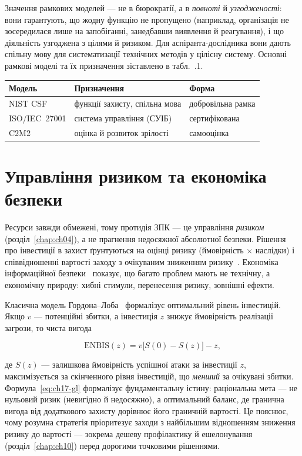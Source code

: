 Значення рамкових моделей --- не в бюрократії, а в \emph{повноті} й \emph{узгодженості}: вони гарантують, що жодну функцію не пропущено (наприклад, організація не зосередилася лише на запобіганні, занедбавши виявлення й реагування), і що діяльність узгоджена з цілями й ризиком. Для аспіранта-дослідника вони дають спільну мову для систематизації технічних методів у цілісну систему. Основні рамкові моделі та їх призначення зіставлено в табл.~\thechapter.1.


\begin{center}\footnotesize
\begin{tabularx}{\linewidth}{L{22mm} Y L{18mm}}
\toprule
Модель & Призначення & Форма \\
\midrule
NIST CSF & функції захисту, спільна мова & добровільна рамка \\
ISO/IEC~27001 & система управління (СУІБ) & сертифікована \\
C2M2 & оцінка й розвиток зрілості & самооцінка \\
\bottomrule
\end{tabularx}
\end{center}

\section{Управління ризиком та економіка безпеки}\label{sec:ch17-risk}

Ресурси завжди обмежені, тому протидія ЗПК --- це управління \emph{ризиком} (розділ~\ref{chap:ch04}), а не прагнення недосяжної абсолютної безпеки. Рішення про інвестиції в захист ґрунтуються на оцінці ризику (ймовірність $\times$ наслідки) і співвідношенні вартості заходу з очікуваним зниженням ризику~\cite{ch17:fair}. Економіка інформаційної безпеки~\cite{ch17:anderson} показує, що багато проблем мають не технічну, а економічну природу: хибні стимули, перенесення ризику, зовнішні ефекти.

Класична модель Гордона--Лоба~\cite{ch17:gordon-loeb} формалізує оптимальний рівень інвестицій. Якщо $v$ --- потенційні збитки, а інвестиція $z$ знижує ймовірність реалізації загрози, то чиста вигода

\begin{equation}
\mathrm{ENBIS}(z) = v\bigl[S(0) - S(z)\bigr] - z,
\label{eq:ch17-gl}
\end{equation}

де $S(z)$ --- залишкова ймовірність успішної атаки за інвестиції $z$, максимізується за скінченного рівня інвестицій, що \emph{менший} за очікувані збитки. Формула~\eqref{eq:ch17-gl} формалізує фундаментальну істину: раціональна мета --- не нульовий ризик (невигідно й недосяжно), а оптимальний баланс, де гранична вигода від додаткового захисту дорівнює його граничній вартості. Це пояснює, чому розумна стратегія пріоритезує заходи з найбільшим відношенням зниження ризику до вартості --- зокрема дешеву профілактику й ешелонування (розділ~\ref{chap:ch10}) перед дорогими точковими рішеннями.

